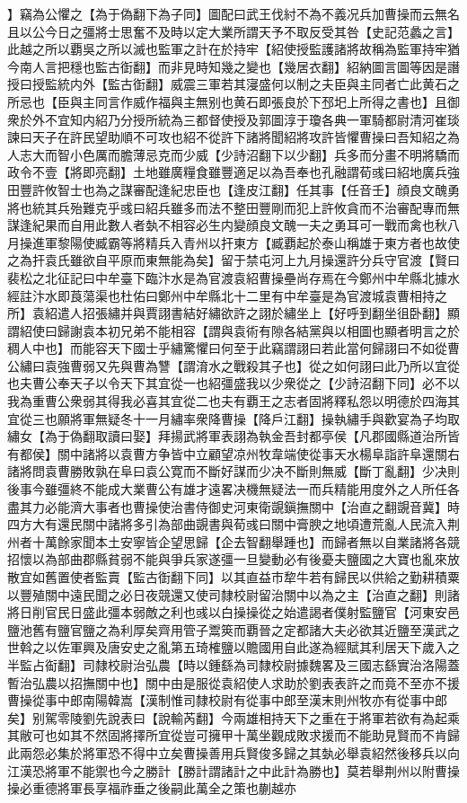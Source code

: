 】竊為公懼之【為于偽翻下為子同】圖配曰武王伐紂不為不義况兵加曹操而云無名且以公今日之彊將士思奮不及時以定大業所謂天予不取反受其咎【史記范蠡之言】此越之所以覇吳之所以滅也監軍之計在於持牢【紹使授監護諸將故稱為監軍持牢猶今南人言把穩也監古衘翻】而非見時知幾之變也【幾居衣翻】紹納圖言圖等因是譖授曰授監統内外【監古衘翻】威震三軍若其寖盛何以制之夫臣與主同者亡此黄石之所忌也【臣與主同言作威作福與主無别也黄石即張良於下邳圯上所得之書也】且御衆於外不宜知内紹乃分授所統為三都督使授及郭圖淳于瓊各典一軍騎都尉清河崔琰諫曰天子在許民望助順不可攻也紹不從許下諸將聞紹將攻許皆懼曹操曰吾知紹之為人志大而智小色厲而膽薄忌克而少威【少詩沼翻下以少翻】兵多而分畫不明將驕而政令不壹【將即亮翻】土地雖廣糧食雖豐適足以為吾奉也孔融謂荀彧曰紹地廣兵強田豐許攸智士也為之謀審配逢紀忠臣也【逢皮江翻】任其事【任音壬】顔良文醜勇將也統其兵殆難克乎彧曰紹兵雖多而法不整田豐剛而犯上許攸貪而不治審配專而無謀逢紀果而自用此數人者埶不相容必生内變顔良文醜一夫之勇耳可一戰而禽也秋八月操進軍黎陽使臧霸等將精兵入青州以扞東方【臧覇起於泰山稱雄于東方者也故使之為扞袁氏雖欲自平原而東無能為矣】留于禁屯河上九月操還許分兵守官渡【賢曰裴松之北征記曰中牟臺下臨汴水是為官渡袁紹曹操壘尚存焉在今鄭州中牟縣北據水經註汴水即莨蕩渠也杜佑曰鄭州中牟縣北十二里有中牟臺是為官渡城袁曹相持之所】袁紹遣人招張繡并與賈詡書結好繡欲許之詡於繡坐上【好呼到翻坐徂卧翻】顯謂紹使曰歸謝袁本初兄弟不能相容【謂與袁術有隙各結黨與以相圖也顯者明言之於稠人中也】而能容天下國士乎繡驚懼曰何至于此竊謂詡曰若此當何歸詡曰不如從曹公繡曰袁強曹弱又先與曹為讐【謂淯水之戰殺其子也】從之如何詡曰此乃所以宜從也夫曹公奉天子以令天下其宜從一也紹彊盛我以少衆從之【少詩沼翻下同】必不以我為重曹公衆弱其得我必喜其宜從二也夫有覇王之志者固將釋私怨以明德於四海其宜從三也願將軍無疑冬十一月繡率衆降曹操【降戶江翻】操執繡手與歡宴為子均取繡女【為于偽翻取讀曰娶】拜揚武將軍表詡為執金吾封都亭侯【凡郡國縣道治所皆有都侯】關中諸將以袁曹方争皆中立顧望凉州牧韋端使從事天水楊阜詣許阜還關右諸將問袁曹勝敗孰在阜曰袁公寛而不斷好謀而少决不斷則無威【斷丁亂翻】少决則後事今雖彊終不能成大業曹公有雄才遠畧决機無疑法一而兵精能用度外之人所任各盡其力必能濟大事者也曹操使治書侍御史河東衛覬鎭撫關中【治直之翻覬音冀】時四方大有還民關中諸將多引為部曲覬書與荀彧曰關中膏腴之地頃遭荒亂人民流入荆州者十萬餘家聞本土安寧皆企望思歸【企去智翻舉踵也】而歸者無以自業諸將各競招懷以為部曲郡縣貧弱不能與爭兵家遂彊一旦變動必有後憂夫鹽國之大寶也亂來放散宜如舊置使者監賣【監古衘翻下同】以其直益市犂牛若有歸民以供給之勤耕積粟以豐殖關中遠民聞之必日夜競還又使司隸校尉留治關中以為之主【治直之翻】則諸將日削官民日盛此彊本弱敵之利也彧以白操操從之始遣謁者僕射監鹽官【河東安邑鹽池舊有鹽官鹽之為利厚矣齊用管子鬻筴而覇晉之定都諸大夫必欲其近鹽至漢武之世斡之以佐軍興及唐安史之亂第五琦榷鹽以贍國用自此遂為經賦其利居天下歲入之半監占䘖翻】司隸校尉治弘農【時以鍾繇為司隸校尉據魏畧及三國志繇實治洛陽蓋暫治弘農以招撫關中也】關中由是服從袁紹使人求助於劉表表許之而竟不至亦不援曹操從事中郎南陽韓嵩【漢制惟司隸校尉有從事中郎至漢末則州牧亦有從事中郎矣】别駕零陵劉先說表曰【說輸芮翻】今兩雄相持天下之重在于將軍若欲有為起乘其敝可也如其不然固將擇所宜從豈可擁甲十萬坐觀成敗求援而不能助見賢而不肯歸此兩怨必集於將軍恐不得中立矣曹操善用兵賢俊多歸之其埶必舉袁紹然後移兵以向江漢恐將軍不能禦也今之勝計【勝計謂諸計之中此計為勝也】莫若舉荆州以附曹操操必重德將軍長享福祚垂之後嗣此萬全之策也蒯越亦